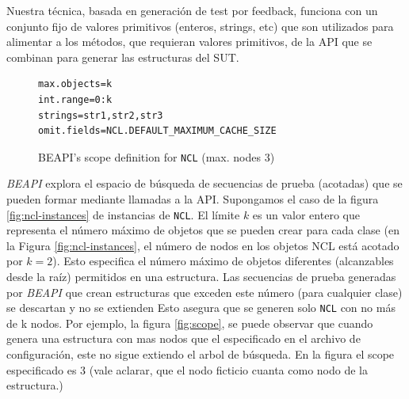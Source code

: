 Nuestra técnica, basada en generación de test por feedback, funciona con un conjunto fijo de valores primitivos (enteros, strings, etc) que son utilizados para alimentar a los métodos, que requieran valores primitivos, de la API que se combinan para generar las estructuras del SUT.

\begin{figure}[H]
\begin{lstlisting}[keywordstyle=\scriptsize\ttfamily]
max.objects=k
int.range=0:k
strings=str1,str2,str3
omit.fields=NCL.DEFAULT_MAXIMUM_CACHE_SIZE
\end{lstlisting}
\caption{\textsf{BEAPI}'s scope definition for \texttt{NCL} (max. nodes 3)}
\label{fig:NCL-fin-BEAPI}
\end{figure}

\emph{BEAPI} explora el espacio de búsqueda de secuencias de prueba (acotadas) que se pueden formar mediante llamadas a la API. Supongamos el caso de la figura \ref{fig:ncl-instances} de instancias de \texttt{NCL}.  El límite $k$ es un valor entero que representa el número máximo de objetos que se pueden crear para cada clase (en la Figura \ref{fig:ncl-instances}, el número de nodos en los objetos NCL está acotado por $k=2$). Esto especifica el número máximo de objetos diferentes (alcanzables desde la raíz) permitidos en una estructura. Las secuencias de prueba generadas por \emph{BEAPI} que crean estructuras que exceden este número (para cualquier clase) se descartan y no se extienden
Esto asegura que se generen solo \texttt{NCL} con no más de k nodos. Por ejemplo, la figura \ref{fig:scope}, se puede observar que cuando genera una estructura con mas nodos que el especificado en el archivo de configuración, este no sigue extiendo el arbol de búsqueda. En la figura el scope especificado es 3 (vale aclarar, que el nodo ficticio cuanta como nodo de la estructura.)

